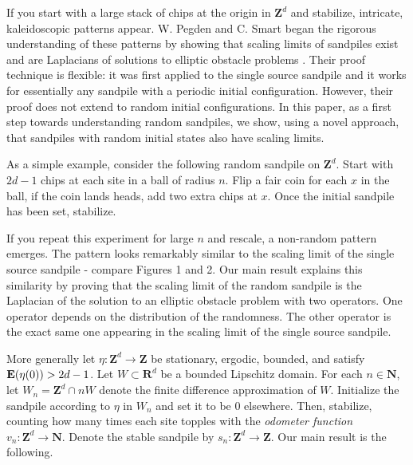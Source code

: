 \documentclass[12pt]{amsart}
\newcommand{\R}{\mathbf{R}}
\newcommand{\Z}{\mathbf{Z}}
\newcommand{\N}{\mathbf{N}}
\newcommand{\E}{\mathop{\bf E{}}}
\begin{document}
	If you start with a large stack of chips at the origin in $\Z^d$ and stabilize, intricate, kaleidoscopic patterns appear. W. Pegden and C. Smart began the rigorous understanding of these patterns by showing that scaling limits of sandpiles exist and are Laplacians of solutions to elliptic obstacle problems \cite{pegden2013convergence}.  Their proof technique is flexible: it was first applied to the single source sandpile and it works for essentially any sandpile with a periodic initial configuration. However, their proof does not extend to random initial configurations. In this paper, as a first step towards understanding random sandpiles, we show, using a novel approach, that sandpiles with random initial states also have scaling limits.

	As a simple example, consider the following random sandpile on $\Z^d$. Start with $2d-1$ chips at
	each site in a ball of radius $n$.  Flip a fair coin for each $x$ in the ball, if the coin lands
	heads, add two extra chips at $x$. Once the initial sandpile has been set, stabilize. 

	 If you repeat this experiment for large $n$ and rescale, a non-random pattern emerges.  The pattern looks remarkably similar to the scaling limit of the single source sandpile -  compare Figures 1 and 2.  Our main result explains this similarity by proving that the scaling limit of the random sandpile is the Laplacian of the solution to an elliptic obstacle problem with two operators. One operator depends on the distribution of the randomness. The other operator is the exact same one appearing in the scaling limit of the single source sandpile. 

	More generally let $\eta: \Z^d \to \Z$ be stationary, ergodic, bounded, and satisfy $\E(\eta(0)) > 2 d-1$. Let $W \subset \R^d$ be a bounded Lipschitz domain. For each $n \in \N$, let $W_n = \Z^d \cap n W$ denote the finite difference approximation of $W$.  Initialize the sandpile according to $\eta$ in $W_n$ and set it to be 0 elsewhere. Then, stabilize, counting how many times each site topples with the {\it odometer function} $v_n : \Z^d \to \N$. Denote the stable sandpile by $s_n: \Z^d \to \Z$. Our main result is the following.
\end{document}
